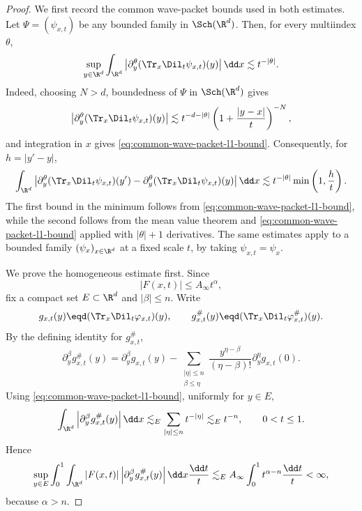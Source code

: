 \begin{proof} We first record the common wave-packet bounds used in both estimates.
Let \(\Psi=(\psi_{x,t})\) be any bounded family in \(\Sch(\R^d)\).
Then, for every multiindex \(\theta\),
\begin{equation}
\label{eq:common-wave-packet-l1-bound}
\sup_{y\in\R^d}
\int_{\R^d}
\left|
\partial_y^\theta
(\Tr_x\Dil_t\psi_{x,t})(y)
\right|
\dd x
\lesssim
t^{-|\theta|}.
\end{equation}
Indeed, choosing \(N>d\), boundedness of \(\Psi\) in \(\Sch(\R^d)\) gives
\[
\left|
\partial_y^\theta
(\Tr_x\Dil_t\psi_{x,t})(y)
\right|
\lesssim
t^{-d-|\theta|}
\left(1+\frac{|y-x|}{t}\right)^{-N},
\]
and integration in \(x\) gives \eqref{eq:common-wave-packet-l1-bound}.
Consequently, for \(h=|y'-y|\),
\begin{equation}
\label{eq:common-wave-packet-difference-bound}
\int_{\R^d}
\left|
\partial_y^\theta
(\Tr_x\Dil_t\psi_{x,t})(y')
-
\partial_y^\theta
(\Tr_x\Dil_t\psi_{x,t})(y)
\right|
\dd x
\lesssim
t^{-|\theta|}
\min\left(1,\frac{h}{t}\right).
\end{equation}
The first bound in the minimum follows from \eqref{eq:common-wave-packet-l1-bound}, while the second follows from the mean value theorem and \eqref{eq:common-wave-packet-l1-bound} applied with \(|\theta|+1\) derivatives.
The same estimates apply to a bounded family \((\psi_x)_{x\in\R^d}\) at a fixed scale \(t\), by taking \(\psi_{x,t}=\psi_x\).

We prove the homogeneous estimate first.
Since
\[
|F(x,t)|\le A_\infty t^\alpha,
\]
fix a compact set \(E\subset\R^d\) and \(|\beta|\le n\).
Write
\[
g_{x,t}(y)\eqd(\Tr_x\Dil_t\varphi_{x,t})(y),
\qquad
g^\#_{x,t}(y)\eqd(\Tr_x\Dil_t\varphi^\#_{x,t})(y).
\]
By the defining identity for \(g^\#_{x,t}\),
\[
\partial_y^\beta g^\#_{x,t}(y)
=
\partial_y^\beta g_{x,t}(y)
-
\sum_{\substack{|\eta|\le n\\
\beta\le \eta}}
\frac{y^{\eta-\beta}}{(\eta-\beta)!}
\partial_y^\eta g_{x,t}(0).
\]
Using \eqref{eq:common-wave-packet-l1-bound}, uniformly for \(y\in E\),
\[
\int_{\R^d}
\left|
\partial_y^\beta g^\#_{x,t}(y)
\right|
\dd x
\lesssim_E
\sum_{|\eta|\le n} t^{-|\eta|}
\lesssim_E
t^{-n},
\qquad 0<t\le 1.
\]
Hence
\[
\sup_{y\in E}
\int_0^1\int_{\R^d}
|F(x,t)|
\left|
\partial_y^\beta g^\#_{x,t}(y)
\right|
\dd x\frac{\dd t}{t}
\lesssim_E
A_\infty
\int_0^1 t^{\alpha-n}\frac{\dd t}{t}
<\infty,
\]
because \(\alpha>n\).


\end{proof}
